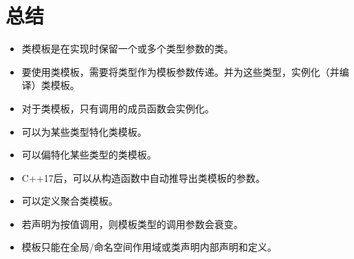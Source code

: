 \section{总结}

\begin{itemize}
\item 
类模板是在实现时保留一个或多个类型参数的类。

\item 
要使用类模板，需要将类型作为模板参数传递。并为这些类型，实例化（并编译）类模板。

\item 
对于类模板，只有调用的成员函数会实例化。

\item 
可以为某些类型特化类模板。

\item 
可以偏特化某些类型的类模板。

\item 
C++17后，可以从构造函数中自动推导出类模板的参数。

\item 
可以定义聚合类模板。

\item 
若声明为按值调用，则模板类型的调用参数会衰变。

\item 
模板只能在全局/命名空间作用域或类声明内部声明和定义。
\end{itemize}